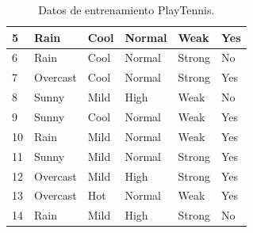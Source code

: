 \documentclass[12pt]{exam}
\begin{document}
\begin{questions}
\begin{table}[]
\begin{tabular}{|l|l|l|l|l|l|}
5                                  & Rain                                  & Cool                                      & Normal                                 & Weak                               & Yes                                      \\ \hline
6                                  & Rain                                  & Cool                                      & Normal                                 & Strong                             & No                                       \\ \hline
7                                  & Overcast                              & Cool                                      & Normal                                 & Strong                             & Yes                                      \\ \hline
8                                  & Sunny                                 & Mild                                      & High                                   & Weak                               & No                                       \\ \hline
9                                  & Sunny                                 & Cool                                      & Normal                                 & Weak                               & Yes                                      \\ \hline
10                                 & Rain                                  & Mild                                      & Normal                                 & Weak                               & Yes                                      \\ \hline
11                                 & Sunny                                 & Mild                                      & Normal                                 & Strong                             & Yes                                      \\ \hline
12                                 & Overcast                              & Mild                                      & High                                   & Strong                             & Yes                                      \\ \hline
13                                 & Overcast                              & Hot                                       & Normal                                 & Weak                               & Yes                                      \\ \hline
14                                 & Rain                                  & Mild                                      & High                                   & Strong                             & No                                       \\ \hline
\end{tabular}
\caption{Datos de entrenamiento PlayTennis.}
\end{table}
\addpoints


\end{questions}
\end{document}
